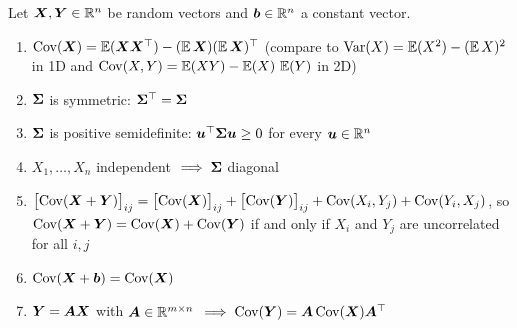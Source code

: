 \begin{theorem}\label{thm:covariance-matrix-properties}
Let $\bm{X}, \bm{Y} \in \mathbb{R}^n$ be random vectors and $\bm{b} \in \mathbb{R}^n$ a constant vector.
\begin{enumerate}
  \item $\operatorname{Cov}(\bm{X}) = \operatorname{\mathbb{E}}(\bm{X}\bm{X}^{\top}) - (\operatorname{\mathbb{E}}\bm{X})(\operatorname{\mathbb{E}}\bm{X})^{\top}$ (compare to $\operatorname{Var}(X) = \operatorname{\mathbb{E}}(X^2) - (\operatorname{\mathbb{E}} X)^2$ in 1D and $\operatorname{Cov}(X, Y) = \operatorname{\mathbb{E}}(XY) - \operatorname{\mathbb{E}}(X)\,\operatorname{\mathbb{E}}(Y)$ in 2D)
  \item $\bm{\Sigma}$ is symmetric: $\bm{\Sigma}^{\top} = \bm{\Sigma}$
  \item $\bm{\Sigma}$ is positive semidefinite: $\bm{u}^{\top}\bm{\Sigma}\bm{u} \ge 0$ for every $\bm{u} \in \mathbb{R}^n$
  \item $X_1, \ldots, X_n$ independent $\implies \bm{\Sigma}$ diagonal
  \item $\bigl[\operatorname{Cov}(\bm{X} + \bm{Y})\bigr]_{ij} = \bigl[\operatorname{Cov}(\bm{X})\bigr]_{ij} + \bigl[\operatorname{Cov}(\bm{Y})\bigr]_{ij} + \operatorname{Cov}(X_i, Y_j) + \operatorname{Cov}(Y_i, X_j)$, so $\operatorname{Cov}(\bm{X} + \bm{Y}) = \operatorname{Cov}(\bm{X}) + \operatorname{Cov}(\bm{Y})$ if and only if $X_i$ and $Y_j$ are uncorrelated for all $i, j$
  \item $\operatorname{Cov}(\bm{X} + \bm{b}) = \operatorname{Cov}(\bm{X})$
  \item $\bm{Y} = \bm{A}\bm{X}$ with $\bm{A} \in \mathbb{R}^{m \times n}$ $\implies \operatorname{Cov}(\bm{Y}) = \bm{A}\operatorname{Cov}(\bm{X})\bm{A}^{\top}$
\end{enumerate}
\end{theorem}

